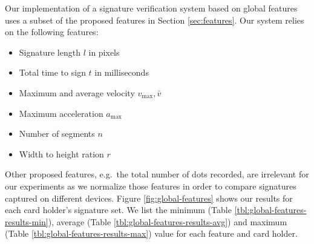 \documentclass[a4paper, oneside]{csthesis}
\begin{document}
Our implementation of a signature verification system based on global features uses a subset of the proposed features in Section \ref{sec:features}. Our system relies on the following features:

\begin{itemize}
\item Signature length $l$ in pixels
\item Total time to sign  $t$ in milliseconds
\item Maximum and average velocity $v_\text{max}, \bar{v}$
\item Maximum acceleration $a_\text{max}$
\item Number of segments $n$
\item Width to height ration $r$
\end{itemize}

Other proposed features, e.g.\ the total number of dots recorded, are irrelevant for our experiments as we normalize those features in order to compare signatures captured on different devices.
Figure \ref{fig:global-features} shows our results for each card holder's signature set. We list the minimum (Table \ref{tbl:global-features-results-min}), average (Table \ref{tbl:global-features-results-avg}) and maximum (Table \ref{tbl:global-features-results-max}) value for each feature and card holder.
\end{document}
